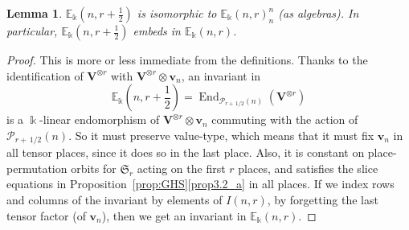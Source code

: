 \documentclass[10pt]{article}
\newtheorem{lemm}[theorem]{Lemma}
\theoremstyle{definition}
\DeclareMathOperator{\End}{End}
\newcommand{\E}{\mathbb{E}}
\newcommand{\Sym}{\mathfrak{S}}
\newcommand{\Ptn}{\mathcal{P}}
\newcommand{\V}{\mathbf{V}} %
\newcommand{\bv}{\mathbf{v}} %
\newcommand{\fhalf}{\frac{1}{2}} %
\begin{document}
\begin{lemm}\label{lem:half-iso}
$\E_\Bbbk(n,r+\fhalf)$ is isomorphic to $\E_\Bbbk(n,r)^n_n$ (as
 algebras). In particular, $\E_\Bbbk(n,r+\fhalf)$ embeds in
 $\E_\Bbbk(n,r)$.
\end{lemm}

\begin{proof}
This is more or less immediate from the definitions. Thanks to the
identification of $\V^{\otimes r}$ with $\V^{\otimes r} \otimes
\bv_n$, an invariant in
\[
\E_\Bbbk\left(n,r+\fhalf\right) = \End_{\Ptn_{r+\,1/2}(n)}(\V^{\otimes r})
\]
is a $\Bbbk$-linear endomorphism of $\V^{\otimes r} \otimes \bv_n$
commuting with the action of $\Ptn_{r+\,1/2}(n)$. So it must preserve
value-type, which means that it must fix $\bv_n$ in all tensor places,
since it does so in the last place. Also, it is constant on
place-permutation orbits for $\Sym_r$ acting on the first $r$ places,
and satisfies the slice equations in Proposition~\ref{prop:GHS}\ref{prop3.2_a} in
all places. If we index rows and columns of the invariant by elements
of $I(n,r)$, by forgetting the last tensor factor (of $\bv_n$), then
we get an invariant in $\E_\Bbbk(n,r)$.
\end{proof}
\end{document}
